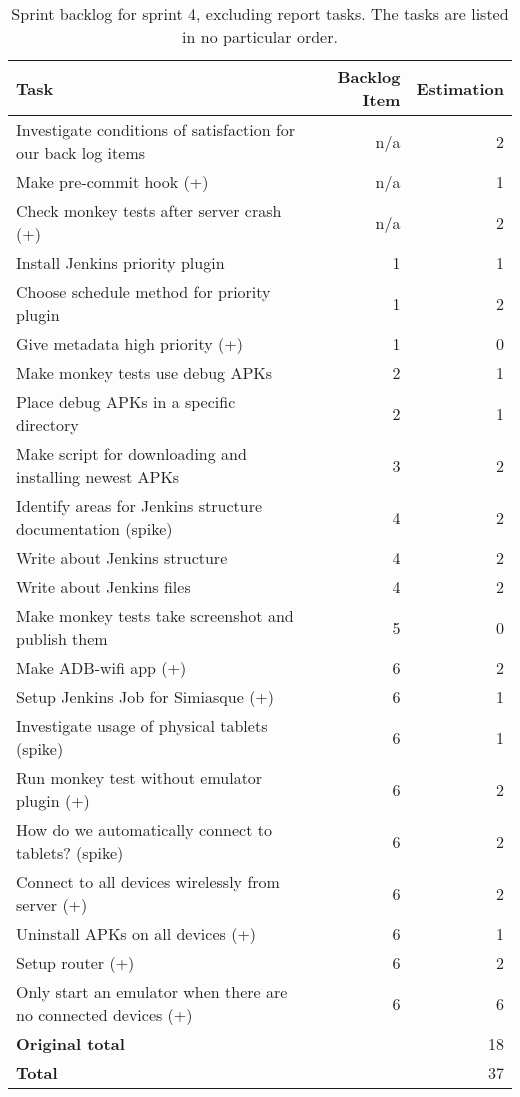 \begin{table}%
  \centering
  \begin{tabular}{p{}rr}
    \toprule
    \textbf{Task} & \textbf{Backlog Item} & \textbf{Estimation} \\
    \midrule
    Investigate conditions of satisfaction for our back log items & n/a & 2 \\
    Make pre-commit hook (+) & n/a & 1 \\
    Check monkey tests after server crash (+) & n/a & 2 \\
    Install Jenkins priority plugin & 1 & 1 \\
    Choose schedule method for priority plugin & 1 & 2 \\
    Give metadata high priority (+) & 1 & 0 \\
    Make monkey tests use debug APKs & 2 & 1 \\
    Place debug APKs in a specific directory & 2 & 1 \\
    Make script for downloading and installing newest APKs & 3 & 2 \\
    Identify areas for Jenkins structure documentation (spike) & 4 & 2 \\
    Write about Jenkins structure & 4 & 2 \\
    Write about Jenkins files & 4 & 2 \\
    Make monkey tests take screenshot and publish them & 5 & 0 \\
    Make ADB-wifi app (+) & 6 & 2 \\
    Setup Jenkins Job for Simiasque (+) & 6 & 1 \\
    Investigate usage of physical tablets (spike) & 6 & 1 \\
    Run monkey test without emulator plugin (+) & 6 & 2 \\
    How do we automatically connect to tablets? (spike) & 6 & 2 \\
    Connect to all devices wirelessly from server (+) & 6 & 2 \\
    Uninstall APKs on all devices (+) & 6 & 1 \\
    Setup router (+) & 6 & 2 \\
    Only start an emulator when there are no connected devices (+) & 6 & 6 \\
    \midrule
    \textbf{Original total} & & 18 \\
    \textbf{Total} & & 37 \\
    \bottomrule
  \end{tabular}
\caption[Sprint 4 backlog]{Sprint backlog for sprint 4, excluding report tasks. The tasks are listed in no particular order.}
\label{tab:sprint4_tasks}
\end{table}
